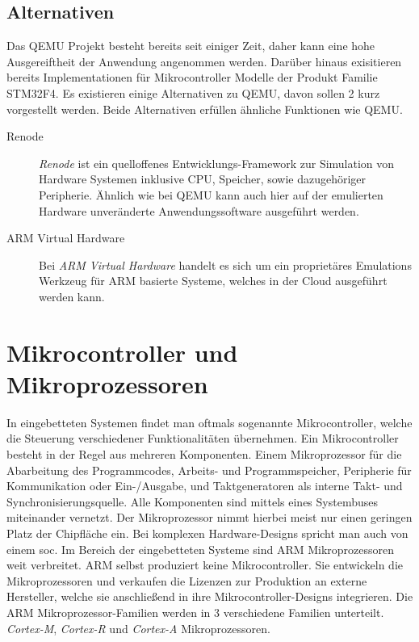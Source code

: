 \subsection{Alternativen}

Das QEMU Projekt besteht bereits seit einiger Zeit, daher kann eine hohe
Ausgereiftheit der Anwendung angenommen werden.
Darüber hinaus exisitieren bereits Implementationen für Mikrocontroller Modelle
der Produkt Familie STM32F4.
Es existieren einige Alternativen zu QEMU, davon sollen 2 kurz vorgestellt
werden.
Beide Alternativen erfüllen ähnliche Funktionen wie QEMU.
\begin{description}
    \item[Renode]
    \textit{Renode} ist ein quelloffenes Entwicklungs-Framework zur Simulation
    von Hardware Systemen inklusive CPU, Speicher, sowie dazugehöriger
    Peripherie\cite{RenodeAbout}.
    Ähnlich wie bei QEMU kann auch hier auf der emulierten Hardware
    unveränderte Anwendungssoftware ausgeführt werden.
    \item[ARM Virtual Hardware]
    Bei \textit{ARM Virtual Hardware} handelt es sich um ein proprietäres
    Emulations Werkzeug für ARM basierte Systeme, welches in der Cloud
        ausgeführt werden kann\cite{ArmVirtualHwAbout}.
\end{description}


\section{Mikrocontroller und Mikroprozessoren}

In eingebetteten Systemen findet man oftmals sogenannte Mikrocontroller, welche
die Steuerung verschiedener Funktionalitäten übernehmen.
Ein Mikrocontroller besteht in der Regel aus mehreren Komponenten.
Einem Mikroprozessor für die Abarbeitung des Programmcodes, Arbeits- und
Programmspeicher, Peripherie für Kommunikation oder Ein-/Ausgabe, und
Taktgeneratoren als interne Takt- und Synchronisierungsquelle.
Alle Komponenten sind mittels eines Systembuses miteinander
vernetzt\cite{DefGuideCM34_JYiu}.
Der Mikroprozessor nimmt hierbei meist nur einen geringen Platz der Chipfläche
ein.
Bei komplexen Hardware-Designs spricht man auch von einem \ac{soc}.
\newline %
Im Bereich der eingebetteten Systeme sind ARM Mikroprozessoren weit verbreitet.
ARM selbst produziert keine Mikrocontroller.
Sie entwickeln die Mikroprozessoren und verkaufen die Lizenzen zur Produktion
an externe Hersteller, welche sie anschließend in ihre Mikrocontroller-Designs
integrieren.
\newline
Die ARM Mikroprozessor-Familien werden in 3 verschiedene Familien unterteilt.
\textit{Cortex-M}, \textit{Cortex-R} und \textit{Cortex-A} Mikroprozessoren.

